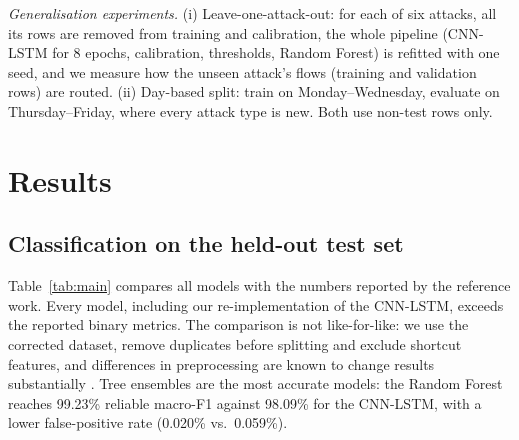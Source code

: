 \documentclass[conference]{IEEEtran}
\begin{document}
\textit{Generalisation experiments.} (i) Leave-one-attack-out: for each of six attacks, all its
rows are removed from training and calibration, the whole pipeline (CNN-LSTM for 8 epochs,
calibration, thresholds, Random Forest) is refitted with one seed, and we measure how the unseen
attack's flows (training and validation rows) are routed. (ii) Day-based split: train on
Monday--Wednesday, evaluate on Thursday--Friday, where every attack type is new. Both use
non-test rows only.

\section{Results}

\subsection{Classification on the held-out test set}
Table~\ref{tab:main} compares all models with the numbers reported by the reference work.
Every model, including our re-implementation of the CNN-LSTM, exceeds the reported binary
metrics. The comparison is not like-for-like: we use the corrected dataset, remove duplicates
before splitting and exclude shortcut features, and differences in preprocessing are known to
change results substantially \cite{engelen2021troubleshooting,arp2022dos}. Tree ensembles are the
most accurate models: the Random Forest reaches 99.23\% reliable macro-F1 against 98.09\% for the
CNN-LSTM, with a lower false-positive rate (0.020\% vs.\ 0.059\%).
\end{document}
